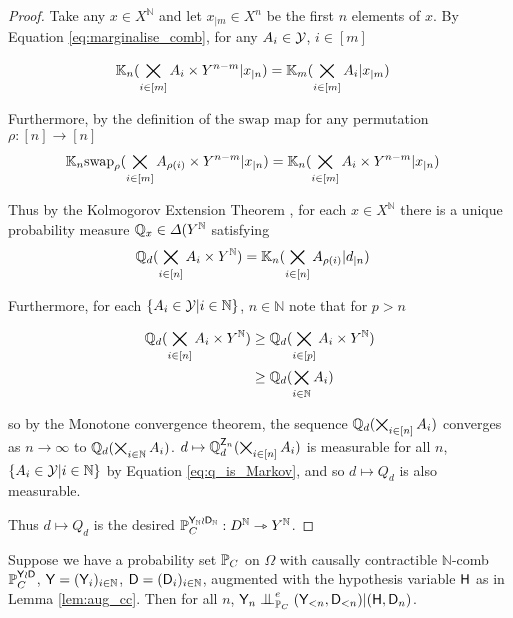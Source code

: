 \begin{proof}
Take any $x\in X^{\mathbb{N}}$ and let $x_{|m}\in X^n$ be the first $n$ elements of $x$. By Equation \ref{eq:marginalise_comb}, for any $A_i\in \mathcal{Y}$, $i\in [m]$

\begin{align}
    \mathbb{K}_n(\bigtimes_{i\in [m]}A_i\times Y^{n-m}|x_{|n}) &= \mathbb{K}_m(\bigtimes_{i\in [m]}A_i|x_{|m})
\end{align}

Furthermore, by the definition of the $\mathrm{swap}$ map for any permutation $\rho:[n]\to[n]$
\begin{align}
    \mathbb{K}_n\mathrm{swap}_{\rho}(\bigtimes_{i\in [m]}A_{\rho(i)}\times Y^{n-m}|x_{|n}) &= \mathbb{K}_n(\bigtimes_{i\in [m]}A_{i}\times Y^{n-m}|x_{|n})
\end{align}

Thus by the Kolmogorov Extension Theorem \citep{cinlar_probability_2011}, for each $x\in X^{\mathbb{N}}$ there is a unique probability measure $\mathbb{Q}_x\in \Delta(Y^{\mathbb{N}}$ satisfying
\begin{align}
    \mathbb{Q}_d(\bigtimes_{i\in [n]}A_i\times Y^{\mathbb{N}}) &= \mathbb{K}_n(\bigtimes_{i\in [n]}A_{\rho(i)}|d_{|n})\label{eq:q_is_Markov}
\end{align}

Furthermore, for each $\{A_i\in\mathcal{Y}|i\in \mathbb{N}\}$, $n\in \mathbb{N}$ note that for $p>n$

\begin{align}
\mathbb{Q}_d(\bigtimes_{i\in[n]} A_i \times Y^{\mathbb{N}})&\geq \mathbb{Q}_d(\bigtimes_{i\in [p]} A_i\times Y^{\mathbb{N}})\\
&\geq \mathbb{Q}_d(\bigtimes_{i\in \mathbb{N}} A_i)
\end{align}

so by the Monotone convergence theorem, the sequence $\mathbb{Q}_d(\bigtimes_{i\in[n]} A_i)$ converges as $n\to \infty$ to $\mathbb{Q}_d(\bigtimes_{i\in\mathbb{N}} A_i)$. $d\mapsto \mathbb{Q}_d^{\mathsf{Z}_n}(\bigtimes_{i\in[n]} A_i)$ is measurable for all $n$, $\{A_i\in\mathcal{Y}|i\in \mathbb{N}\}$ by Equation \ref{eq:q_is_Markov}, and so $d\mapsto Q_d$ is also measurable.

Thus $d\mapsto Q_d$ is the desired $\mathbb{P}_C^{\mathsf{Y}_{\mathbb{N}}\wr \mathsf{D}_{\mathbb{N}}}:D^\mathbb{N}\rightarrowtriangle Y^\mathbb{N}$.
\end{proof}


\begin{theorem}
Suppose we have a probability set $\mathbb{P}_C$ on $\Omega$ with causally contractible $\mathbb{N}$-comb $\mathbb{P}_C^{\mathsf{Y}\wr \mathsf{D}}$, $\mathsf{Y}=(\mathsf{Y}_i)_{i\in\mathbb{N}}$, $\mathsf{D}=(\mathsf{D}_i)_{i\in\mathbb{N}}$, augmented with the hypothesis variable $\mathsf{H}$ as in Lemma \ref{lem:aug_cc}. Then for all $n$, $\RV{Y}_n\CI^e_{\prob{P}_C}(\RV{Y}_{<n},\RV{D}_{<n})|(\RV{H},\RV{D}_n)$.
\end{theorem}

